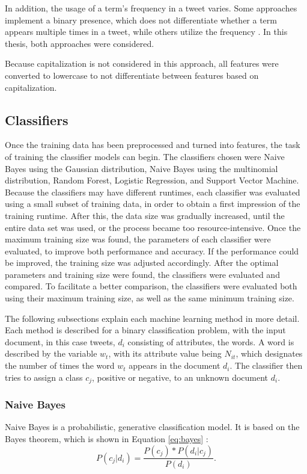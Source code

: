 In addition, the usage of a term's frequency in a tweet varies. Some approaches implement a binary presence, which does not differentiate whether a term appears multiple times in a tweet, while others utilize the frequency \cite{DBLP:journals/csur/GiachanouC16}. In this thesis, both approaches were considered.

Because capitalization is not considered in this approach, all features were converted to lowercase to not differentiate between features based on capitalization.

\subsection{Classifiers}
\label{sub:classifiers}

Once the training data has been preprocessed and turned into features, the task of training the classifier models can begin. The classifiers chosen were Naive Bayes using the Gaussian distribution, Naive Bayes using the multinomial distribution, Random Forest, Logistic Regression, and Support Vector Machine. Because the classifiers may have different runtimes, each classifier was evaluated using a small subset of training data, in order to obtain a first impression of the training runtime. After this, the data size was gradually increased, until the entire data set was used, or the process became too resource-intensive. Once the maximum training size was found, the parameters of each classifier were evaluated, to improve both performance and accuracy. If the performance could be improved, the training size was adjusted accordingly. After the optimal parameters and training size were found, the classifiers were evaluated and compared. To facilitate a better comparison, the classifiers were evaluated both using their maximum training size, as well as the same minimum training size.

The following subsections explain each machine learning method in more detail. Each method is described for a binary classification problem, with the input document, in this case tweets, $d_i$ consisting of attributes, the words. A word is described by the variable $w_t$, with its attribute value being $N_{it}$, which designates the number of times the word $w_t$ appears in the document $d_i$. The classifier then tries to assign a class $c_j$, positive or negative, to an unknown document $d_i$.

    \subsubsection{Naive Bayes}
    \label{sub:nb}
        Naive Bayes is a probabilistic, generative classification model. It is based on the Bayes theorem, which is shown in Equation \eqref{eq:bayes} \cite{DBLP:books/aw/TanSKK2019}:
        \begin{equation}
            \label{eq:bayes}
            P(c_j|d_i) = \frac{P(c_j) * P(d_i|c_j)}{P(d_i)}.
        \end{equation}


